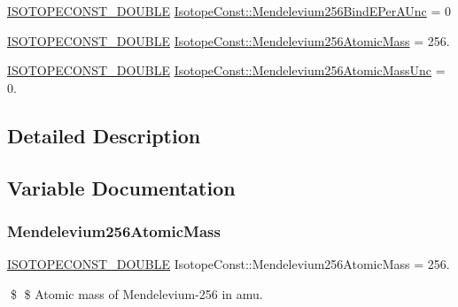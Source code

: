 \begin{DoxyCompactItemize}
\item 
\mbox{\hyperlink{group___isotope_const-_macros_ga8f45a7272ce02c0b4c65c44636ed719a}{I\+S\+O\+T\+O\+P\+E\+C\+O\+N\+S\+T\+\_\+\+D\+O\+U\+B\+LE}} \mbox{\hyperlink{group___isotope_const-_mendelevium-_md256_ga6c8a5efb5350b979f432784de752db47}{Isotope\+Const\+::\+Mendelevium256\+Bind\+E\+Per\+A\+Unc}} = 0
\item 
\mbox{\hyperlink{group___isotope_const-_macros_ga8f45a7272ce02c0b4c65c44636ed719a}{I\+S\+O\+T\+O\+P\+E\+C\+O\+N\+S\+T\+\_\+\+D\+O\+U\+B\+LE}} \mbox{\hyperlink{group___isotope_const-_mendelevium-_md256_gab3cf62891ce529919b94b8f898ed1f85}{Isotope\+Const\+::\+Mendelevium256\+Atomic\+Mass}} = 256.
\item 
\mbox{\hyperlink{group___isotope_const-_macros_ga8f45a7272ce02c0b4c65c44636ed719a}{I\+S\+O\+T\+O\+P\+E\+C\+O\+N\+S\+T\+\_\+\+D\+O\+U\+B\+LE}} \mbox{\hyperlink{group___isotope_const-_mendelevium-_md256_ga10b1e1b178a3d33e7331969c0b5991d5}{Isotope\+Const\+::\+Mendelevium256\+Atomic\+Mass\+Unc}} = 0.
\end{DoxyCompactItemize}


\subsection{Detailed Description}


\subsection{Variable Documentation}
\mbox{\label{group___isotope_const-_mendelevium-_md256_gab3cf62891ce529919b94b8f898ed1f85}} 
\subsubsection{\texorpdfstring{Mendelevium256\+Atomic\+Mass}{Mendelevium256AtomicMass}}
{\footnotesize\ttfamily \mbox{\hyperlink{group___isotope_const-_macros_ga8f45a7272ce02c0b4c65c44636ed719a}{I\+S\+O\+T\+O\+P\+E\+C\+O\+N\+S\+T\+\_\+\+D\+O\+U\+B\+LE}} Isotope\+Const\+::\+Mendelevium256\+Atomic\+Mass = 256.}

\$ \$ Atomic mass of Mendelevium-\/256 in amu. \mbox{\label{group___isotope_const-_mendelevium-_md256_ga10b1e1b178a3d33e7331969c0b5991d5}} 
